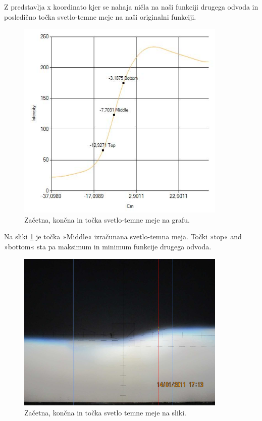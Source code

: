 \documentclass[oneside, a4paper, 12pt]{book}
\begin{document}
Z predstavlja x koordinato kjer se nahaja ničla na naši funkciji drugega odvoda in posledično točka svetlo-temne meje na naši originalni funkciji.

\begin{figure}
\begin{center}
\includegraphics[width=10cm]{slike/svetlo-temna-meja.jpg}
\end{center}
\caption{Začetna, končna in točka svetlo-temne meje na grafu.}
\label{pic:svet-tem}
\end{figure}

Na sliki \ref{pic:svet-tem} je točka »Middle« izračunana svetlo-temna meja. Točki »top« and »bottom« sta pa maksimum in minimum funkcije drugega odvoda. 


\begin{figure}
\begin{center}
\includegraphics[width=10cm]{slike/svetlo-temna-meja-orig.jpg}
\end{center}
\caption{Začetna, končna in točka svetlo temne meje na sliki.}
\label{pic:svet-tem2}
\end{figure}
\end{document}
